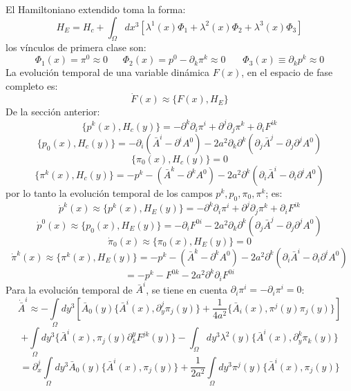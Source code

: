 \documentclass[a4paper,12pt]{article}
\begin{document}
El Hamiltoniano extendido toma la forma:
\begin{equation}
H_E=H_c+ \int_{\Omega}dx^3[\lambda^1(x)\Phi_1+\lambda^2(x)\Phi_2+\lambda^3(x)\Phi_3 ]
\end{equation}
los vínculos de primera clase son:
\begin{equation}
\Phi_1(x)=\pi^0\approx0 \ \ \ \ \ \ \ \Phi_2(x)=p^0-\partial_k\pi^k\approx0\ \ \ \ \ \ \ \ \Phi_3(x)\equiv\partial_kp^{k}\approx0 
\end{equation}
La evolución temporal de una variable dinámica $F(x)$, en el espacio de fase completo es:
\begin{equation}
\dot F(x)\approx\{F(x),H_E\} 
\end{equation}
De la sección anterior:
\begin{equation}
\{p^{k}(x),H_c(y)\}=-\partial^k\partial_i\pi^{i}+\partial^j\partial_j\pi^{k}+\partial_iF^{ik}
\end{equation}
$$\{p_0(x),H_c(y)\}=-\partial_i(\bar{A}^i-\partial^iA^0)-2a^2\partial_k\partial^k(\partial_j\bar{A}^j-\partial_j\partial^jA^0)$$
$$\{\pi_0(x),H_c(y)\}=0$$
$$\{\pi^k(x),H_c(y)\}=-p^{k}-(\bar{A}^k-\partial^k A^0)-2a^2\partial^k(\partial_i\bar{A}^i-\partial_i\partial^iA^0)$$
por lo tanto la evolución temporal de los campos $p^{k},p_0,\pi_0,\pi^k$; es:
\begin{equation}
\dot p^{k}(x)\approx\{p^{k}(x),H_E(y)\}=-\partial^k\partial_i\pi^{i}+\partial^j\partial_j\pi^{k}+\partial_iF^{ik}
\end{equation}
$$\dot p^{0}(x)\approx\{p_0(x),H_E(y)\}=-\partial_iF^{0i}-2a^2\partial_k\partial^k(\partial_j\bar{A}^j-\partial_j\partial^jA^0)$$
$$\dot \pi_{0}(x)\approx\{\pi_0(x),H_E(y)\}=0$$
$$\dot \pi^{k}(x)\approx\{\pi^k(x),H_E(y)\}=-p^{k}-(\bar{A}^k-\partial^k A^0)-2a^2\partial^k(\partial_i\bar{A}^i-\partial_i\partial^iA^0)$$
$$=-p^{k}-F^{0k}-2a^2\partial^k\partial_i F^{0i}$$
Para la evolución temporal de $\bar{A}^i$, se tiene en cuenta $\partial_i\pi^i=-\partial_i\pi^i=0$: 
\begin{equation}
\dot{\bar{ A}}^i\approx-\int\limits_{\Omega}dy^{3}\left[\bar{A}_0(y)\{\bar{ A}^i(x),\partial^j_y \pi_j(y)\} +\frac{1}{4a^2}\{\bar{ A}_i(x),\pi^{j}(y)\pi_j(y)\}\right]
\end{equation}
$$+\int\limits_{\Omega}dy^{3}\{\bar{ A}^i(x),\pi_{j}(y)\partial_k^y F^{jk}(y)\}-\int_{\Omega}dy^3\lambda^2(y)\{\bar{ A}^i(x),\partial^k_y\pi_k(y)\}$$
$$=\partial^j_x\int\limits_{\Omega}dy^{3}\bar{A}_0(y)\{\bar{ A}^i(x), \pi_j(y)\}+\frac{1}{2a^2}\int\limits_{\Omega}dy^{3}\pi^{j}(y)\{\bar{ A}^i(x),\pi_j(y)\}$$
\end{document}
